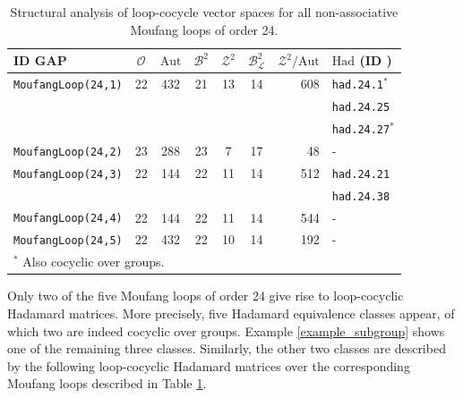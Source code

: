 \documentclass[11pt,a4paper]{article}
\begin{document}
\begin{table}[ht]
\centering
\caption{Structural analysis of loop-cocycle vector spaces for all non-associative Moufang loops of order 24.}
\label{tab:spaces}
\begin{tabular}{@{}lcccccrl}
\toprule
\textbf{ID GAP} &  \textbf{$\mathcal{O}$} & \textbf{$\mathrm{Aut}$} & \textbf{$\mathcal{B}^2$} & \textbf{$\mathcal{Z}^2$}  & \textbf{$\mathcal{B}^2_\mathcal{L}$} &  \textbf{$\mathcal{Z}^2/\mathrm{Aut}$} & \textbf{$\mathrm{Had}$} (\textbf{ID \citep{Sloane}}) \\ \midrule
\texttt{MoufangLoop(24,1)} & 22 & 432 & 21 & 13 & 14 &608 & \texttt{had.24.1}$^*$\\
 &  &  &   &  &  & & \texttt{had.24.25}\\
 &  &  &   &  &  & & \texttt{had.24.27}$^*$\\
\texttt{MoufangLoop(24,2)} & 23  & 288 & 23 & 7 & 17 &48 & -\\
\texttt{MoufangLoop(24,3)} & 22 & 144 &  22 & 11 & 14 &512 & \texttt{had.24.21}\\
 &  &  &   &  &  & & \texttt{had.24.38}\\
\texttt{MoufangLoop(24,4)} & 22 & 144 &  22 & 11 & 14 &544 & -\\
\texttt{MoufangLoop(24,5)} & 22 & 432 & 22 & 10 & 14 &192 & -\\ \bottomrule
\multicolumn{8}{l}{\footnotesize $^*$ Also cocyclic over groups.}
\end{tabular}
\end{table}

Only two of the five Moufang loops of order 24 give rise to loop-cocyclic Hadamard matrices. More precisely, five Hadamard equivalence classes appear, of which two are indeed cocyclic over groups. Example \ref{example_subgroup} shows one of the remaining three classes. Similarly, the other two classes are described by the following loop-cocyclic Hadamard matrices over the corresponding Moufang loops described in Table \ref{tab:spaces}.
\end{document}
